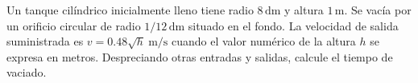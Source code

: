 Un tanque cilíndrico inicialmente lleno tiene radio $8\,\mathrm{dm}$ y altura $1\,\mathrm m$. Se vacía por un orificio circular de radio $1/12\,\mathrm{dm}$ situado en el fondo. La velocidad de salida suministrada es $v=0.48\sqrt h\ \mathrm{m/s}$ cuando el valor numérico de la altura $h$ se expresa en metros. Despreciando otras entradas y salidas, calcule el tiempo de vaciado.
